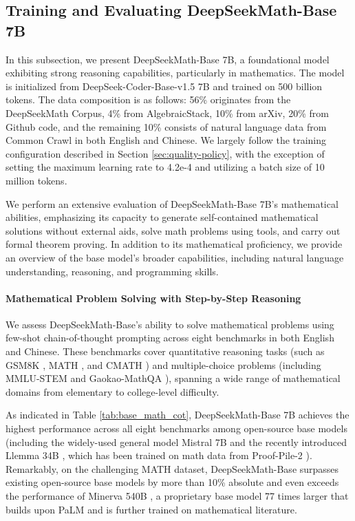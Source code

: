 \subsection{Training and Evaluating DeepSeekMath-Base 7B}

In this subsection, we present DeepSeekMath-Base 7B, a foundational model exhibiting strong reasoning capabilities, particularly in mathematics. The model is initialized from DeepSeek-Coder-Base-v1.5 7B \citep{deepseek-coder} and trained on 500 billion tokens. The data composition is as follows: 56\% originates from the DeepSeekMath Corpus, 4\% from AlgebraicStack, 10\% from arXiv, 20\% from Github code, and the remaining 10\% consists of natural language data from Common Crawl in both English and Chinese. We largely follow the training configuration described in Section \ref{sec:quality-policy}, with the exception of setting the maximum learning rate to 4.2e-4 and utilizing a batch size of 10 million tokens.

We perform an extensive evaluation of DeepSeekMath-Base 7B’s mathematical abilities, emphasizing its capacity to generate self-contained mathematical solutions without external aids, solve math problems using tools, and carry out formal theorem proving. In addition to its mathematical proficiency, we provide an overview of the base model’s broader capabilities, including natural language understanding, reasoning, and programming skills.

\paragraph{Mathematical Problem Solving with Step-by-Step Reasoning}

We assess DeepSeekMath-Base's ability to solve mathematical problems using few-shot chain-of-thought prompting \citep{cot} across eight benchmarks in both English and Chinese. These benchmarks cover quantitative reasoning tasks (such as GSM8K \citep{gsm8k}, MATH \citep{MATH}, and CMATH \citep{wei2023cmath}) and multiple-choice problems (including MMLU-STEM \citep{mmlu} and Gaokao-MathQA \citep{agieval}), spanning a wide range of mathematical domains from elementary to college-level difficulty.

As indicated in Table \ref{tab:base_math_cot}, DeepSeekMath-Base 7B achieves the highest performance across all eight benchmarks among open-source base models (including the widely-used general model Mistral 7B \citep{mistral} and the recently introduced Llemma 34B \citep{llemma}, which has been trained on math data from Proof-Pile-2 \citep{llemma}). Remarkably, on the challenging MATH dataset, DeepSeekMath-Base surpasses existing open-source base models by more than 10\% absolute and even exceeds the performance of Minerva 540B \citep{minerva}, a proprietary base model 77 times larger that builds upon PaLM \citep{palm} and is further trained on mathematical literature.

